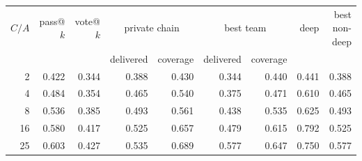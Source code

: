 \begin{tabular}{rrrrrrrrr}
\toprule
$C/A$ & pass@$k$ & vote@$k$ & \multicolumn{2}{c}{private chain} & \multicolumn{2}{c}{best team} & deep & best non-deep \\
 & & & delivered & coverage & delivered & coverage & & \\ \midrule
2 & 0.422 & 0.344 & 0.388 & 0.430 & 0.344 & 0.440 & 0.441 & 0.388 \\
4 & 0.484 & 0.354 & 0.465 & 0.540 & 0.375 & 0.471 & 0.610 & 0.465 \\
8 & 0.536 & 0.385 & 0.493 & 0.561 & 0.438 & 0.535 & 0.625 & 0.493 \\
16 & 0.580 & 0.417 & 0.525 & 0.657 & 0.479 & 0.615 & 0.792 & 0.525 \\
25 & 0.603 & 0.427 & 0.535 & 0.689 & 0.577 & 0.647 & 0.750 & 0.577 \\
\bottomrule
\end{tabular}
